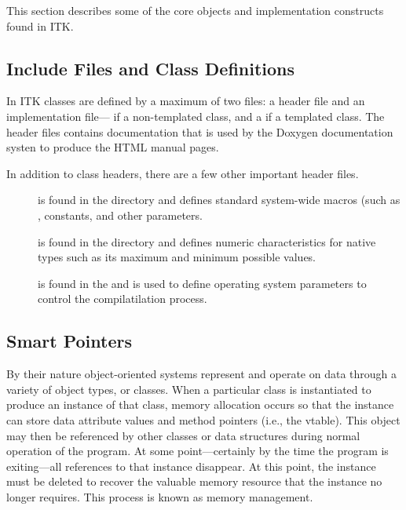 This section describes some of the core objects and implementation constructs
found in ITK.

\subsection{Include Files and Class Definitions}
\label{sec:IncludeFiles}

In ITK classes are defined by a maximum of two files: a header  file
and an implementation file--- if a non-templated class, and a
 if a templated class. The header files contains documentation that
is used by the Doxygen documentation systen to produce the HTML manual pages.

In addition to class headers, there are a few other important header files.
\begin{description}
        \item[] is found in the  directory
        and defines standard system-wide macros (such as ,
        constants, and other parameters.

        \item[] is found in the  
        directory and defines numeric characteristics for native types such
        as its maximum and minimum possible values.

        \item[] is found in the  
        and is used to define operating system parameters to control
        the compilatilation process.
\end{description}

\subsection{Smart Pointers}
\label{sec:SmartPointers}

By their nature object-oriented systems represent and operate on data through
a variety of object types, or classes. When a particular class is
instantiated to produce an instance of that class, memory allocation occurs
so that the instance can store data attribute values and method pointers
(i.e., the vtable). This object may then be referenced by other classes or
data structures during normal operation of the program. At some
point---certainly by the time the program is exiting---all references to that
instance disappear. At this point, the instance must be deleted to recover
the valuable memory resource that the instance no longer requires. This process
is known as memory management.

